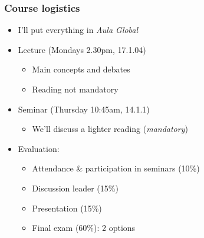 \documentclass[aspectratio=43]{beamer}
\begin{document}
%
%
%
%

\begin{frame}
\frametitle{Course logistics}
\centering

\begin{itemize}
\item I'll put everything in \textit{Aula Global}
\item Lecture (Mondays 2.30pm, 17.1.04)
  \begin{itemize}
    \item Main concepts and debates
    \item Reading not mandatory
  \end{itemize}
\item Seminar (Thursday 10:45am, 14.1.1)
  \begin{itemize}
    \item We'll discuss a lighter reading (\textit{mandatory})
  \end{itemize}
\item Evaluation:
  \begin{itemize}
  \item Attendance \& participation in seminars (10\%)
  \item Discussion leader (15\%)
  \item Presentation (15\%)
  \item Final exam (60\%): 2 options
  \end{itemize}
\end{itemize}

\end{frame}
\end{document}
